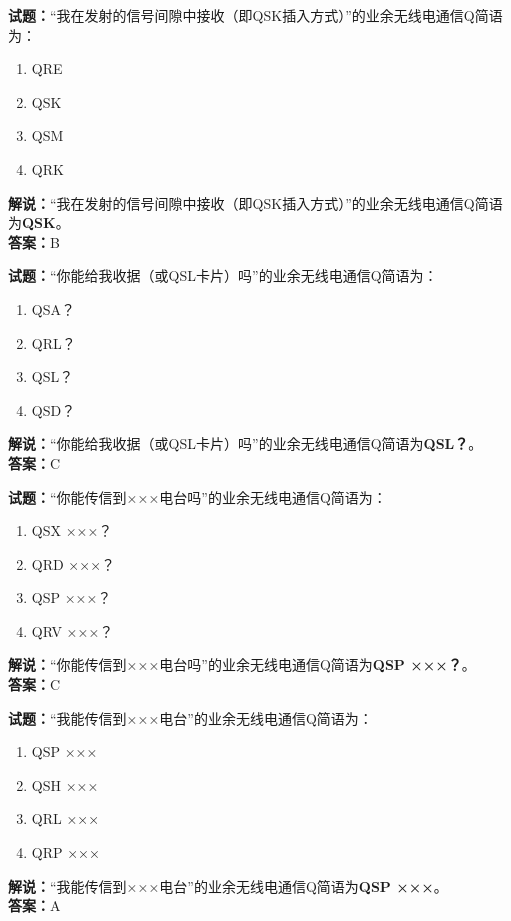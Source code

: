 \documentclass{ctexbook}
\begin{document}
\bigskip


\noindent\textbf{试题：}“我在发射的信号间隙中接收（即QSK插入方式）”的业余无线电通信Q简语为：
\begin{enumerate}[leftmargin=3em]
\item QRE
\item QSK
\item QSM
\item QRK
\end{enumerate}
\noindent\textbf{解说：}“我在发射的信号间隙中接收（即QSK插入方式）”的业余无线电通信Q简语为\textbf{QSK}。\\\noindent\textbf{答案：}B



\bigskip


\noindent\textbf{试题：}“你能给我收据（或QSL卡片）吗”的业余无线电通信Q简语为：
\begin{enumerate}[leftmargin=3em]
\item QSA？
\item QRL？
\item QSL？
\item QSD？
\end{enumerate}
\noindent\textbf{解说：}“你能给我收据（或QSL卡片）吗”的业余无线电通信Q简语为\textbf{QSL？}。\\\noindent\textbf{答案：}C




\bigskip


\noindent\textbf{试题：}“你能传信到×××电台吗”的业余无线电通信Q简语为：
\begin{enumerate}[leftmargin=3em]
\item QSX ×××？
\item QRD ×××？
\item QSP ×××？
\item QRV ×××？
\end{enumerate}
\noindent\textbf{解说：}“你能传信到×××电台吗”的业余无线电通信Q简语为\textbf{QSP ×××？}。\\\noindent\textbf{答案：}C



\bigskip


\noindent\textbf{试题：}“我能传信到×××电台”的业余无线电通信Q简语为：
\begin{enumerate}[leftmargin=3em]
\item QSP ×××
\item QSH ×××
\item QRL ×××
\item QRP ×××
\end{enumerate}
\noindent\textbf{解说：}“我能传信到×××电台”的业余无线电通信Q简语为\textbf{QSP ×××}。\\\noindent\textbf{答案：}A
\end{document}
